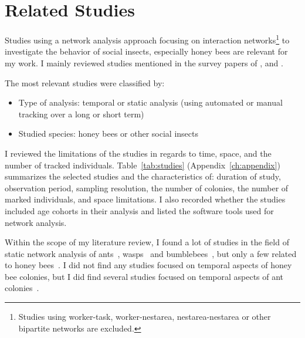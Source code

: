 \section{Related Studies}
\label{ch:relatedwork}

Studies using a network analysis approach focusing on interaction networks\footnote{Studies using worker-task, worker-nestarea, nestarea-nestarea or other bipartite networks are excluded.} to investigate the behavior of social insects, especially honey bees are relevant for my work.
I mainly reviewed studies mentioned in the survey papers of \textcite{Pinter-Wollman2014}, \textcite[chapter~15]{krause2014animal} and \textcite{charbonneau2013social}.

The most relevant studies were classified by:

\begin{itemize}
\item Type of analysis: temporal or static analysis (using automated or manual tracking over a long or short term)
\item Studied species: honey bees or other social insects
\end{itemize}

I reviewed the limitations of the studies in regards to time, space, and the number of tracked individuals. Table~\ref{tab:studies} (Appendix~\ref{ch:appendix}) summarizes the selected studies and the characteristics of: duration of study, observation period, sampling resolution, the number of colonies, the number of marked individuals, and space limitations.
I also recorded whether the studies included age cohorts in their analysis and listed the software tools used for network analysis.

Within the scope of my literature review, I found a lot of studies in the field of static network analysis of ants~\cite{greenwald2015ant,pinter2011effect,quevillon2015social,formica2012fitness,waters2012information,sendova2010emergency}, wasps~\cite{naug2009structure} and bumblebees~\cite{otterstatter2007contact}, but only a few related to honey bees~\cite{baracchi2014socio,naug2008structure,scholl2011olfactory,naug2007experimentally}.
I did not find any studies focused on temporal aspects of honey bee colonies, but I did find several studies focused on temporal aspects of ant colonies~\cite{mersch2013tracking,blonder2011time,jeanson2012long}.

